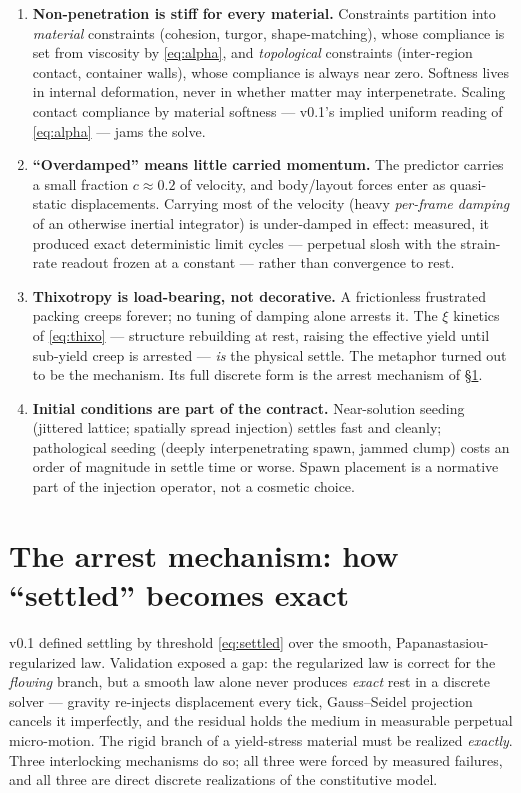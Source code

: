\documentclass[11pt]{article}
\begin{document}
\begin{enumerate}[leftmargin=2.2em,label=\textbf{C\arabic*.}]
  \item \textbf{Non-penetration is stiff for every material.} Constraints partition into
  \emph{material} constraints (cohesion, turgor, shape-matching), whose compliance is set from
  viscosity by \eqref{eq:alpha}, and \emph{topological} constraints (inter-region contact,
  container walls), whose compliance is always near zero. Softness lives in internal
  deformation, never in whether matter may interpenetrate. Scaling contact compliance by
  material softness --- v0.1's implied uniform reading of \eqref{eq:alpha} --- jams the solve.
  \item \textbf{``Overdamped'' means little carried momentum.} The predictor carries a small
  fraction $c\approx0.2$ of velocity, and body/layout forces enter as quasi-static
  displacements. Carrying most of the velocity (heavy \emph{per-frame damping} of an otherwise
  inertial integrator) is under-damped in effect: measured, it produced exact deterministic
  limit cycles --- perpetual slosh with the strain-rate readout frozen at a constant --- rather
  than convergence to rest.
  \item \textbf{Thixotropy is load-bearing, not decorative.} A frictionless frustrated packing
  creeps forever; no tuning of damping alone arrests it. The $\xi$ kinetics of \eqref{eq:thixo}
  --- structure rebuilding at rest, raising the effective yield until sub-yield creep is
  arrested --- \emph{is} the physical settle. The metaphor turned out to be the mechanism. Its
  full discrete form is the arrest mechanism of \S\ref{sec:arrest}.
  \item \textbf{Initial conditions are part of the contract.} Near-solution seeding (jittered
  lattice; spatially spread injection) settles fast and cleanly; pathological seeding (deeply
  interpenetrating spawn, jammed clump) costs an order of magnitude in settle time or worse.
  Spawn placement is a normative part of the injection operator, not a cosmetic choice.
\end{enumerate}

\section{The arrest mechanism: how ``settled'' becomes exact}\label{sec:arrest}

v0.1 defined settling by threshold \eqref{eq:settled} over the smooth, Papanastasiou-regularized
law. Validation exposed a gap: the regularized law is correct for the \emph{flowing} branch, but
a smooth law alone never produces \emph{exact} rest in a discrete solver --- gravity re-injects
displacement every tick, Gauss--Seidel projection cancels it imperfectly, and the residual holds
the medium in measurable perpetual micro-motion. The rigid branch of a yield-stress material
must be realized \emph{exactly}. Three interlocking mechanisms do so; all three were forced by
measured failures, and all three are direct discrete realizations of the constitutive model.
\end{document}
